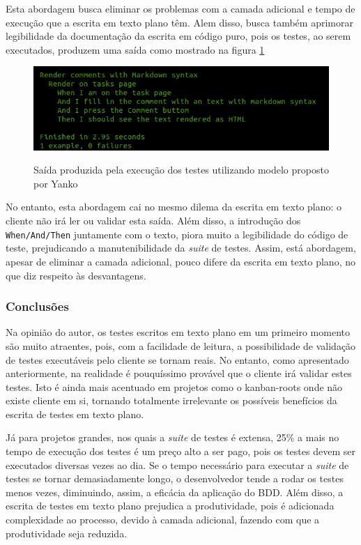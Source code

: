 Esta abordagem busca eliminar os problemas com a camada adicional e tempo de execução que a escrita em texto plano têm. Alem disso, busca também aprimorar legibilidade da documentação da escrita em código puro, pois os testes, ao serem executados, produzem uma saída como mostrado na figura \ref{img:output-novo-modelo}

\begin{figure}[h]
  \center
  \caption{Saída produzida pela execução dos testes utilizando modelo proposto por Yanko}
  \includegraphics[scale=0.6]{images/output-novo-modelo}
  \label{img:output-novo-modelo}
\end{figure}

No entanto, esta abordagem cai no mesmo dilema da escrita em texto plano: o cliente não irá ler ou validar esta saída. Além disso, a introdução dos \texttt{When/And/Then} juntamente com o texto, piora muito a legibilidade do código de teste, prejudicando a manutenibilidade da \textit{suite} de testes. Assim, está abordagem, apesar de eliminar a camada adicional, pouco difere da escrita em texto plano, no que diz respeito às desvantagens.


\subsubsection{Conclusões} %
\label{subsub:conclusoes_bdd}

Na opinião do autor, os testes escritos em texto plano em um primeiro momento são muito atraentes, pois, com a facilidade de leitura, a possibilidade de validação de testes executáveis pelo cliente se tornam reais. No entanto, como apresentado anteriormente, na realidade é pouquíssimo provável que o cliente irá validar estes testes. Isto é ainda mais acentuado em projetos como o kanban-roots onde não existe cliente em si, tornando totalmente irrelevante os possíveis benefícios da escrita de testes em texto plano.

Já para projetos grandes, nos quais a \textit{suite} de testes é extensa, 25\% a mais no tempo de execução dos testes é um preço alto a ser pago, pois os testes devem ser executados diversas vezes ao dia. Se o tempo necessário para executar a \textit{suite} de testes se tornar demasiadamente longo, o desenvolvedor tende a rodar os testes menos vezes, diminuindo, assim, a eficácia da aplicação do BDD. Além disso, a escrita de testes em texto plano prejudica a produtividade, pois é adicionada complexidade ao processo, devido à camada adicional, fazendo com que a produtividade seja reduzida.

